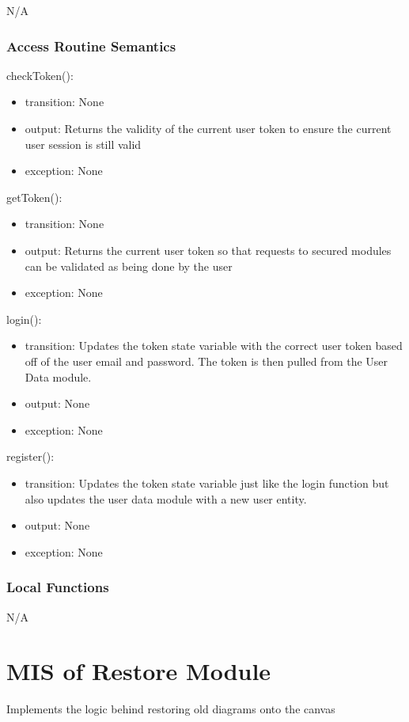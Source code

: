 \documentclass[12pt, titlepage]{article}
\begin{document}
N/A

\subsubsection{Access Routine Semantics}

\noindent checkToken():
\begin{itemize}
\item transition: None
\item output: Returns the validity of the current user token to ensure the current user session is still valid
\item exception: None
\end{itemize}

\noindent getToken():
\begin{itemize}
\item transition: None
\item output: Returns the current user token so that requests to secured modules can be validated as being done by the user
\item exception: None
\end{itemize}

\noindent login():
\begin{itemize}
\item transition: Updates the token state variable with the correct user token based off of the user email and password. The token is then pulled from the User Data module. 
\item output: None
\item exception: None
\end{itemize}

\noindent register():
\begin{itemize}
\item transition: Updates the token state variable just like the login function but also updates the user data module with a new user entity. 
\item output: None
\item exception: None
\end{itemize}


\subsubsection{Local Functions}

N/A
\newpage

\section{MIS of Restore Module} \label{mRestoreMIS} 
Implements the logic behind restoring old diagrams onto the canvas 
\end{document}

